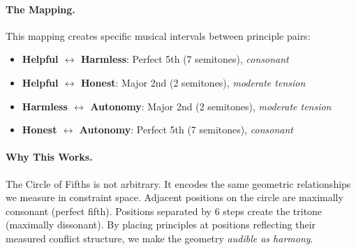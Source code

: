 \documentclass{article}
\theoremstyle{plain}
\theoremstyle{definition}
\theoremstyle{remark}
\begin{document}
\paragraph{The Mapping.}
\begin{center}
\small
{}
\end{center}

This mapping creates specific musical intervals between principle pairs:
\begin{itemize}
\item \textbf{Helpful $\leftrightarrow$ Harmless}: Perfect 5th (7 semitones), \emph{consonant}
\item \textbf{Helpful $\leftrightarrow$ Honest}: Major 2nd (2 semitones), \emph{moderate tension}
\item \textbf{Harmless $\leftrightarrow$ Autonomy}: Major 2nd (2 semitones), \emph{moderate tension}
\item \textbf{Honest $\leftrightarrow$ Autonomy}: Perfect 5th (7 semitones), \emph{consonant}
\end{itemize}

\paragraph{Why This Works.}
The Circle of Fifths is not arbitrary. It encodes the same geometric relationships we measure in constraint space. Adjacent positions on the circle are maximally consonant (perfect fifth). Positions separated by 6 steps create the tritone (maximally dissonant). By placing principles at positions reflecting their measured conflict structure, we make the geometry \emph{audible as harmony}.
\end{document}
